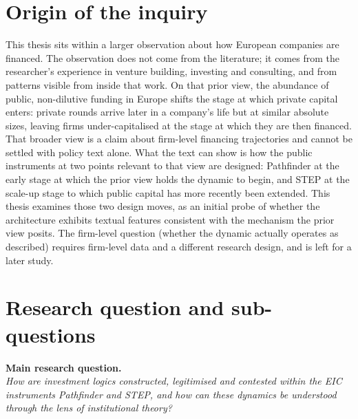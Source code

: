 \section{Origin of the inquiry}
\label{sec:intro-origin}

This thesis sits within a larger observation about how European
companies are financed. The observation does not come from the
literature; it comes from the researcher's experience in venture
building, investing and consulting, and from patterns visible
from inside that work. On that prior view, the abundance of
public, non-dilutive funding in Europe shifts the stage at which
private capital enters: private rounds arrive later in a
company's life but at similar absolute sizes, leaving firms
under-capitalised at the stage at which they are then financed.
That broader view is a claim about firm-level financing
trajectories and cannot be settled with policy text alone. What
the text can show is how the public instruments at two points
relevant to that view are designed: Pathfinder at the early
stage at which the prior view holds the dynamic to begin, and
STEP at the scale-up stage to which public capital has more
recently been extended. This thesis examines those two design
moves, as an initial probe of whether the architecture exhibits
textual features consistent with the mechanism the prior view
posits. The firm-level question (whether the dynamic actually
operates as described) requires firm-level data and a different
research design, and is left for a later study.

\section{Research question and sub-questions}
\label{sec:intro-rq}

\noindent\textbf{Main research question.} \\
\textit{How are investment logics constructed, legitimised and contested
within the EIC instruments Pathfinder and STEP, and how can these dynamics
be understood through the lens of institutional theory?}

